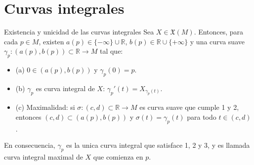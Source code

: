 \section{Curvas integrales}
\begin{booktheorem}{Existencia y unicidad de las curvas integrales}
Sea $X \in \mathfrak X(M)$. Entonces, para cada $p \in M$, existen $a(p)\in\{-\infty\}\cup\mathbb R$, $b(p)\in\mathbb R\cup\{+\infty\}$ y una curva suave $\gamma_p:(a(p),b(p))\subset\mathbb R\to M$ tal que:

\begin{itemize}
\item (a) $0\in(a(p),b(p))$ y $\gamma_p(0)=p$.
\item (b)  $\gamma_p$ es curva integral de $X$: $\gamma_p'(t)=X_{\gamma_p(t)}$.
\item (c) Maximalidad: si $\sigma:(c,d)\subset\mathbb R\to M$ es curva suave que cumple 1 y 2, entonces $(c,d)\subset(a(p),b(p))$ y $\sigma(t)=\gamma_p(t)$ para todo $t\in(c,d)$.
\end{itemize}
En consecuencia, $\gamma_p$ es la unica curva integral que satisface 1, 2 y 3, y es llamada curva integral maximal de $X$ que comienza en $p$.

\end{booktheorem}
